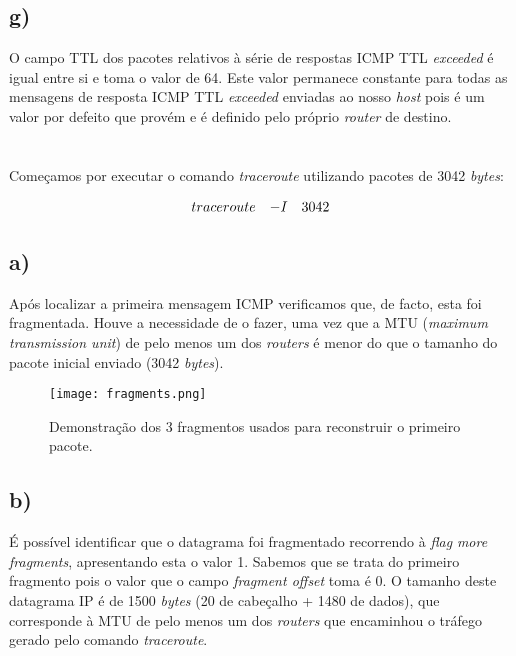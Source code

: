 \documentclass{llncs}
\begin{document}
\subsection*{g)}

O campo TTL dos pacotes relativos à série de respostas ICMP TTL \textit{exceeded} é igual entre si e toma o valor de 64. Este valor permanece constante para todas as mensagens de resposta ICMP TTL \textit{exceeded} enviadas ao nosso \textit{host} pois é um valor por defeito que provém e é definido pelo próprio \textit{router} de destino.

\setlength{\voffset}{-1.0in}

\section{}

Começamos por executar o comando \textit{traceroute} utilizando pacotes de 3042 \textit{bytes}:

\[
    \begin{array}{l l l l l}
        traceroute&-I&3042
    \end{array}
\]

\subsection*{a)}

Após localizar a primeira mensagem ICMP verificamos que, de facto, esta foi fragmentada. Houve a necessidade de o fazer, uma vez que a MTU (\textit{maximum transmission unit}) de pelo menos um dos \textit{routers} é menor do que o tamanho do pacote inicial enviado (3042 \textit{bytes}).

\begin{figure}[!ht]
    \begin{center}
        \texttt{[image: fragments.png]}
        \caption{Demonstração dos 3 fragmentos usados para reconstruir o primeiro pacote.}
    \end{center}
\end{figure}

\vspace{-3.8em}

\subsection*{b)}

É possível identificar que o datagrama foi fragmentado recorrendo à \textit{flag} \textit{more fragments}, apresentando esta o valor 1. Sabemos que se trata do primeiro fragmento pois o valor que o campo \textit{fragment offset} toma é 0. O tamanho deste datagrama IP é de 1500 \textit{bytes} (20 de cabeçalho + 1480 de dados), que corresponde à MTU de pelo menos um dos \textit{routers} que encaminhou o tráfego gerado pelo comando \textit{traceroute}.
\end{document}
